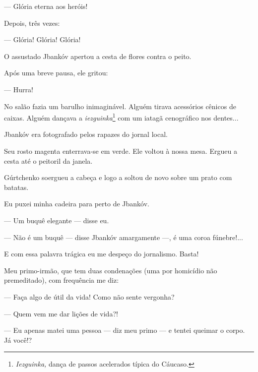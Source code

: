 --- Glória eterna aos heróis!

Depois, três vezes:

--- Glória! Glória! Glória!

O assustado Jbankóv apertou a cesta de flores contra o peito.

Após uma breve pausa, ele gritou:

--- Hurra!

No salão fazia um barulho inimaginável. Alguém tirava acessórios cênicos
de caixas. Alguém dançava a \emph{iezguinka}\footnote{\emph{Iezguinka,}
  dança de passos acelerados típica do Cáucaso.} com um iatagã
cenográfico nos dentes...

Jbankóv era fotografado pelos rapazes do jornal local.

Seu rosto magenta enterrava-se em verde. Ele voltou à nossa mesa. Ergueu
a cesta até o peitoril da janela.

Gúrtchenko soergueu a cabeça e logo a soltou de novo sobre um prato com
batatas.

Eu puxei minha cadeira para perto de Jbankóv.

--- Um buquê elegante --- disse eu.

--- Não é um buquê --- disse Jbankóv amargamente ---, é uma coroa
fúnebre!...

E com essa palavra trágica eu me despeço do jornalismo. Basta!

Meu primo-irmão, que tem duas condenações (uma por homicídio não
premeditado), com frequência me diz:

--- Faça algo de útil da vida! Como não sente vergonha?

--- Quem vem me dar lições de vida?!

--- Eu apenas matei uma pessoa --- diz meu primo --- e tentei queimar o
corpo. Já você!?
